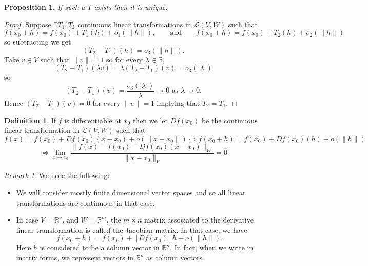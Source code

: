 \documentclass[11pt,openany]{book}
\theoremstyle{plain}
\newtheorem{proposition}{Proposition}[chapter]
\theoremstyle{definition}
\newtheorem{definition}{Definition}[chapter]
\theoremstyle{remark}
\newtheorem{remark}{Remark}[chapter]
\begin{document}
\begin{proposition}
        If such a $T$ exists then it is unique.
\end{proposition}

\begin{proof}
Suppose $\exists T_1, T_2$ continuous linear transformations in $\mathcal{L}(V,W)$ such that \[f(x_0+h) = f(x_0)+T_1(h)+o_1(\|h\|),\qquad \text{and}\qquad f(x_0+h) = f(x_0)+T_2(h)+o_2(\|h\|)\] so subtracting we get \[(T_2-T_1)(h) = o_3(\|h\|).\] 
Take $v\in V$ such that $\|v\| = 1$ so for every $\lambda\in \mathbb R$,
\[(T_2-T_1)(\lambda v) =\lambda(T_2-T_1)(v) = o_3(|\lambda|)\] so \[(T_2-T_1)(v) = \frac{o_3(|\lambda|)}{\lambda}\to 0 \text{ as $\lambda\to 0$}.\] Hence $(T_2 - T_1)(v) = 0$ for every $\|v\|=1$ implying that $T_2 = T_1$.
\end{proof}

\begin{definition}
    If $f$ is differentiable at $x_0$ then we let $Df(x_0)$ be the continuous linear transformation in $\mathcal{L}(V,W)$ such that \[f(x) = f(x_0)+Df(x_0)(x-x_0)+ o(\|x-x_0\|) \iff 
    f(x_0+h) = f(x_0)+Df(x_0)(h)+ o(\|h\|)
    \]
    \[\iff
    \lim_{x\to x_0}\frac{\|f(x)-f(x_0)-Df(x_0)(x-x_0)\|_W}{\|x-x_0\|_V} = 0\]
\end{definition}

\begin{remark}
We note the following:
\begin{itemize}
    \item We will consider mostly finite dimensional vector spaces and so all linear transformations are continuous in that case.
    \item In case $V=\mathbb R^n$, and $W=\mathbb R^m$, the $m\times n$ matrix associated to the derivative linear transformation is called the Jacobian matrix. In that case, we have
    $$f(x_0+h)=f(x_0)+[Df(x_0)]h+o(\|h\|).$$
    Here $h$ is considered to be a column vector in $\mathbb R^n$. In fact, when we write in matrix forms, we represent vectors in $\mathbb R^n$ as column vectors.
\end{itemize}
    
\end{remark}
\end{document}

